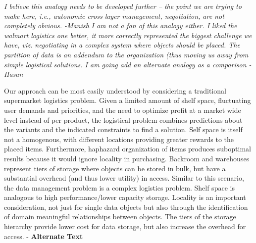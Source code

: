 \documentclass[11pt,letterpaper]{article}
\newcommand{\manish}[1]{{\it \color{red} #1 -Manish}}
\newcommand{\hasan}[1]{{\it \color{darkgreen} #1 -Hasan }}
\newcommand{\ALT}[1]{{\color{red} #1 - {\bf Alternate Text}}}
\newcommand{\manish}[1]{}
\newcommand{\hasan}[1]{}
\newcommand{\ALT}[1]{}}
\begin{document}
\manish{I believe this analogy needs to be developed further -- the point we
  are trying to make here, i.e., autonomic cross layer management,
  negotiation, are not completely obvious.}
\hasan{I am not a fan of this analogy either. I liked the walmart logistics
  one better, it more correctly represented the biggest challenge we have,
  viz. negotiating in a complex system where objects should be placed. The
  partition of data is an addendum to the organization (thus moving us away
  from simple logistical solutions. I am going add an alternate analogy as a
  comparison}

\ALT{Our approach can be most easily understood by considering a traditional
  supermarket logistics problem. Given a limited amount of shelf space,
  fluctuating user demands and priorities, and the need to optimize profit at
  a market wide level instead of per product, the logistical problem combines
  predictions about the variants and the indicated constraints to find a
  solution. Self space is itself not a homogenous, with different locations
  providing greater rewards to the placed items. Furthermore, haphazard
  organization of items produces suboptimal results because it would ignore
  locality in purchasing. Backroom and warehouses represent tiers of storage
  where objects can be stored in bulk, but have a substantial overhead (and
  thus lower utility) in access. Similar to this scenario, the data management
  problem is a complex logistics problem. Shelf space is analogous to high
  performance/lower capacity storage. Locality is an important consideration,
  not just for single data objects but also through the identification of
  domain meaningful relationships between objects. The tiers of the storage
  hierarchy provide lower cost for data storage, but also increase the
  overhead for access.}
\end{document}
